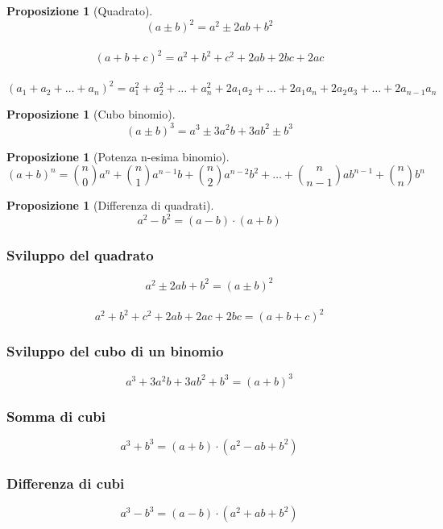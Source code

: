 \documentclass[a4paper,12pt]{article}
\theoremstyle{mystyle}
\newtheorem{proposition}[theorem]{Proposizione}
\begin{document}
\begin{proposition}[Quadrato]
    \[(a \pm b)^2 = a^2 \pm 2ab + b^2  \]\\

    \[(a+b+c)^2 = a^2 + b^2 + c^2 + 2ab + 2bc + 2ac\]\\

    \[(a_1+a_2+ \ldots + a_n)^2 = a_1^2 + a_2^2 + \ldots + a_n^2 + 2a_1a_2 + \ldots + 2a_1a_n + 2a_2a_3 + \ldots + 2a_{n-1}a_n \]
\end{proposition}

\begin{proposition}[Cubo binomio]
    \[(a \pm b)^3 = a^3 \pm 3a^2b + 3ab^2 \pm b^3\]
\end{proposition}

\begin{proposition}[Potenza n-esima binomio]
    \[(a+b)^n = \binom{n}{0}a^n + \binom{n}{1}a^{n-1}b + \binom{n}{2}a^{n-2}b^2 + \ldots + \binom{n}{n-1}ab^{n-1} + \binom{n}{n}b^n \]
\end{proposition}

\begin{proposition}[Differenza di quadrati]
    \[a^2 - b^2 = (a-b) \cdot (a+b)\]
\end{proposition}

\subsubsection{Sviluppo del quadrato}

\[a^2 \pm 2ab + b^2 = (a \pm b)^2\]\\

\[a^2 + b^2 + c^2 + 2ab + 2ac + 2bc = (a + b + c)^2 \]

\subsubsection{Sviluppo del cubo di un binomio}

\[a^3 + 3a^2b + 3ab^2 + b^3 = (a + b)^3\]

\subsubsection{Somma di cubi}

\[a^3 + b^3 = (a+b) \cdot (a^2-ab+b^2)\]

\subsubsection{Differenza di cubi}
\[a^3 - b^3 = (a-b) \cdot (a^2 + ab + b^2)\]
\end{document}
